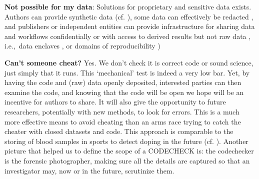 \documentclass[12pt]{article}
\begin{document}
\textbf{Not possible for my data}: 
Solutions for proprietary and sensitive data exists.
Authors can provide synthetic data (cf. \cite{shannon_opening_2018}), some
data can effectively be redacted \cite{oloughlin_data_2015}, and publishers or
independent entities can provide infrastructure for sharing data and workflows
confidentially \cite{perignon_certify_2019} or with access to derived results
but not raw data \cite{shannon_opening_2018},
i.e.,~data enclaves \cite{foster_research_2018},
or domains of reproducibility \cite{harris_more_2017})

\textbf{Can't someone cheat?} Yes. We don't check it is correct code or
sound science,
just simply that it runs. This `mechanical' test is indeed a very low bar.
Yet, by having the code and (raw) data openly deposited, interested parties can
then examine the code, and knowing that the code will be open we hope will
be an incentive for authors to share. It will also give the opportunity 
to future researchers, potentially with new methods, to look for errors.
This is a much more effective means to avoid cheating than an arms race
trying to catch the cheater with closed datasets and code. This approach
is comparable to the storing of blood samples in sports to detect
doping in the future (cf. \cite{everythinghertz97}).
Another picture that helped us to define the scope of a CODECHECK is:
the codechecker is the forensic photographer, making sure all the details
are captured so that an investigator may, now or in the future, scrutinize
them.
\end{document}
